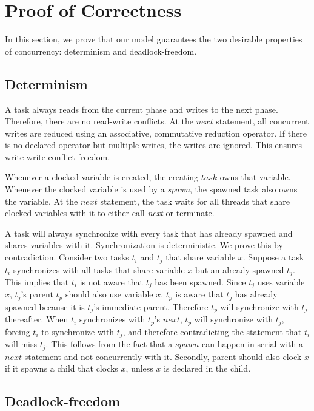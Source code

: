 \documentclass[10pt, conference, compsocconf]{IEEEtran}
\begin{document}
\section{Proof of Correctness}
\label{sec:proof}
In this section, we prove that our model guarantees the two desirable properties of concurrency: determinism
and deadlock-freedom.

\subsection{Determinism}
A task always reads from the current phase and writes to the next phase.
Therefore, there are no read-write conflicts.
At the $next$ statement, all concurrent writes are reduced using an associative, commutative
reduction operator. If there is no declared operator but multiple writes,
the writes are ignored. This ensures write-write conflict freedom.

Whenever a clocked variable is created, the creating $task$ owns that
variable. Whenever the clocked variable is used by a \emph{spawn}, the spawned
task also owns the variable. At the $next$ statement, the task waits for all 
threads that share clocked variables with it to either call \emph{next} or terminate.

A task will always synchronize with every task that has already spawned and shares variables with it. Synchronization is deterministic.
We prove this by contradiction. Consider two tasks $t_i$ and $t_j$
that share variable $x$. Suppose a task $t_i$ synchronizes with 
all tasks that share variable $x$  but an already spawned $t_j$.
This implies that $t_i$ is not aware that $t_j$ has been spawned.
Since $t_j$ uses variable $x$, $t_j$'s parent $t_p$ should
also use variable $x$.  $t_p$ is aware that $t_j$ has already spawned because
it is $t_j$'s immediate parent. Therefore $t_p$ will synchronize with $t_j$ thereafter. 
When $t_i$ synchronizes with $t_p$'s $next$, $t_p$ will synchronize with $t_j$, 
forcing $t_i$ to synchronize with $t_j$, and therefore  contradicting the statement that $t_i$ will
miss $t_j$. This follows from the fact that a $spawn$ can happen in serial with a $next$ statement
and not concurrently with it.  Secondly, parent should also clock  $x$ if it spawns a child 
that clocks $x$, unless $x$ is declared in the child.


\subsection{Deadlock-freedom}
\end{document}
